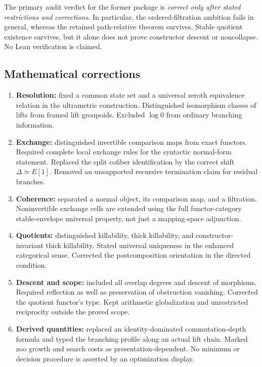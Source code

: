 \documentclass[11pt]{article}
\theoremstyle{definition}
\theoremstyle{remark}
\begin{document}
The primary audit verdict for the former package is \emph{correct only after stated restrictions and corrections}. In particular, the ordered-filtration ambition fails in general, whereas the retained path-relative theorem survives. Stable quotient existence survives, but it alone does not prove constructor descent or noncollapse. No Lean verification is claimed.

\subsection{Mathematical corrections}
\begin{enumerate}
\item \textbf{Resolution:} fixed a common state set and a universal zeroth equivalence relation in the ultrametric construction. Distinguished isomorphism classes of lifts from framed lift groupoids. Excluded $\log 0$ from ordinary branching information.
\item \textbf{Exchange:} distinguished invertible comparison maps from exact functors. Required complete local exchange rules for the syntactic normal-form statement. Replaced the split cofiber identification by the correct shift $\Delta\simeq E[1]$. Removed an unsupported recursive termination claim for residual branches.
\item \textbf{Coherence:} separated a normal object, its comparison map, and a filtration. Noninvertible exchange cells are extended using the full functor-category stable-envelope universal property, not just a mapping-space adjunction.
\item \textbf{Quotients:} distinguished killability, thick killability, and constructor-invariant thick killability. Stated universal uniqueness in the enhanced categorical sense. Corrected the postcomposition orientation in the directed condition.
\item \textbf{Descent and scope:} included all overlap degrees and descent of morphisms. Required reflection as well as preservation of obstruction vanishing. Corrected the quotient functor's type. Kept arithmetic globalization and unrestricted reciprocity outside the proved scope.
\item \textbf{Derived quantities:} replaced an identity-dominated commutation-depth formula and typed the branching profile along an actual lift chain. Marked zoo growth and search costs as presentation-dependent. No minimum or decision procedure is asserted by an optimization display.
\end{enumerate}
\end{document}

